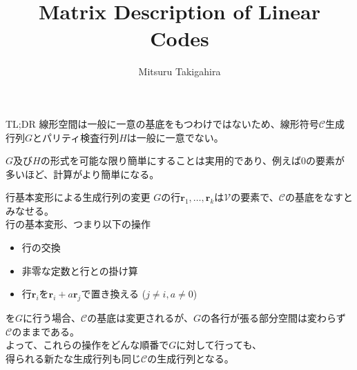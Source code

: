 \documentclass[dvipdfmx,10pt,jsarticle]{beamer}
\title{Matrix Description of Linear Codes}
\author{Mitsuru Takigahira}
\date[2017/11/20]{}
\begin{document}
  \frame{\maketitle}
  \begin{frame}{TL;DR}
    線形空間は一般に一意の基底をもつわけではないため、線形符号$\mathcal{C}$生成行列$G$とパリティ検査行列$H$は一般に一意でない。

    $G$及び$H$の形式を可能な限り簡単にすることは実用的であり、例えば$0$の要素が多いほど、計算がより簡単になる。
  \end{frame}

  \begin{frame}{行基本変形による生成行列の変更}
    $G$の行$\mathbf{r}_1, \ldots, \mathbf{r}_k$は$\mathcal{V}$の要素で、$\mathcal{C}$の基底をなすとみなせる。\\
    行の基本変形、つまり以下の操作
    \begin{itemize}
      \item 行の交換
      \item 非零な定数と行との掛け算
      \item 行$\mathbf{r}_i$を$\mathbf{r}_i + a\mathbf{r}_j$で置き換える ($j \neq i, a \neq 0$)
    \end{itemize}
    を$G$に行う場合、$\mathcal{C}$の基底は変更されるが、$G$の各行が張る部分空間は変わらず\\ 
    $\mathcal{C}$のままである。\\
    よって、これらの操作をどんな順番で$G$に対して行っても、 \\
    得られる新たな生成行列も同じ$\mathcal{C}$の生成行列となる。
  \end{frame}
\end{document}
